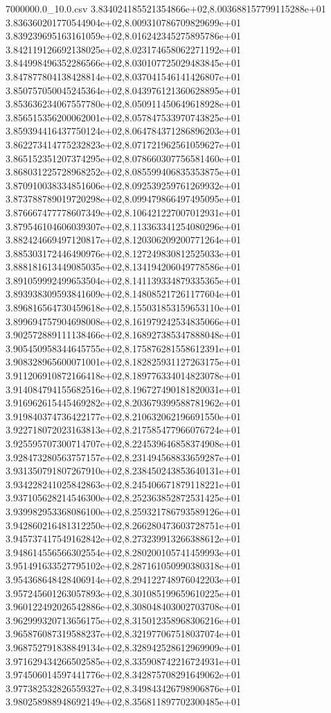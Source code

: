\begin{filecontents*}{7000000.0_10.0.csv}
3.834024185521354866e+02,8.003688157799115288e+01
3.836360201770544904e+02,8.009310786709829699e+01
3.839239695163161059e+02,8.016242345275895786e+01
3.842119126692138025e+02,8.023174658062271192e+01
3.844998496352286566e+02,8.030107725029483845e+01
3.847877804138428814e+02,8.037041546141426807e+01
3.850757050045245364e+02,8.043976121360628895e+01
3.853636234067557780e+02,8.050911450649618928e+01
3.856515356200062001e+02,8.057847533970743825e+01
3.859394416437750124e+02,8.064784371286896203e+01
3.862273414775232823e+02,8.071721962561059627e+01
3.865152351207374295e+02,8.078660307756581460e+01
3.868031225728968252e+02,8.085599406835353875e+01
3.870910038334851606e+02,8.092539259761269932e+01
3.873788789019720298e+02,8.099479866497495095e+01
3.876667477778607349e+02,8.106421227007012931e+01
3.879546104606039307e+02,8.113363341254080296e+01
3.882424669497120817e+02,8.120306209200771264e+01
3.885303172446490976e+02,8.127249830812525033e+01
3.888181613449085035e+02,8.134194206049778586e+01
3.891059992499653504e+02,8.141139334879335365e+01
3.893938309593841609e+02,8.148085217261177604e+01
3.896816564730459618e+02,8.155031853159653110e+01
3.899694757904698008e+02,8.161979242534835066e+01
3.902572889111138466e+02,8.168927385347888048e+01
3.905450958344645755e+02,8.175876281558612391e+01
3.908328965600071001e+02,8.182825931127263175e+01
3.911206910872166418e+02,8.189776334014823078e+01
3.914084794155682516e+02,8.196727490181820031e+01
3.916962615445469282e+02,8.203679399588781962e+01
3.919840374736422177e+02,8.210632062196691550e+01
3.922718072023163813e+02,8.217585477966076724e+01
3.925595707300714707e+02,8.224539646858374908e+01
3.928473280563757157e+02,8.231494568833659287e+01
3.931350791807267910e+02,8.238450243853640131e+01
3.934228241025842863e+02,8.245406671879118221e+01
3.937105628214546300e+02,8.252363852872531425e+01
3.939982953368086100e+02,8.259321786793589126e+01
3.942860216481312250e+02,8.266280473603728751e+01
3.945737417549162842e+02,8.273239913266388612e+01
3.948614556566302554e+02,8.280200105741459993e+01
3.951491633527795102e+02,8.287161050990380318e+01
3.954368648428406914e+02,8.294122748976042203e+01
3.957245601263057893e+02,8.301085199659610225e+01
3.960122492026542886e+02,8.308048403002703708e+01
3.962999320713656175e+02,8.315012358968306216e+01
3.965876087319588237e+02,8.321977067518037074e+01
3.968752791838849134e+02,8.328942528612969909e+01
3.971629434266502585e+02,8.335908742216724931e+01
3.974506014597441776e+02,8.342875708291649062e+01
3.977382532826559327e+02,8.349843426798906876e+01
3.980258988948692149e+02,8.356811897702300485e+01

\end{filecontents*}
